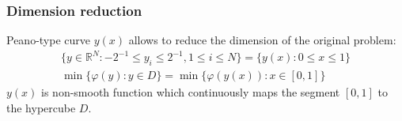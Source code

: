 \documentclass[aspectratio=1610]{beamer}
\begin{document}
\begin{frame}
  \begin{center}
  \frametitle{Dimension reduction}
  Peano-type curve \(y(x)\) allows to reduce the dimension of the original problem:
  \begin{gather}
    \lbrace y\in \mathbb{R}^N:-2^{-1}\leqslant y_i\leqslant 2^{-1},1\leqslant i\leqslant N\rbrace=\{y(x):0\leqslant x\leqslant 1\} \nonumber \\
    \min\{\varphi(y): y\in D\}=\min\{\varphi(y(x)): x\in [0,1]\} \nonumber
  \end{gather}
  \(y(x)\) is non-smooth function which continuously maps the segment \([0,1]\) to the hypercube \(D\).
  \begin{figure}[ht]
    \vspace*{-0.5cm}
  \end{figure}
\end{center}
\end{frame}
\end{document}
